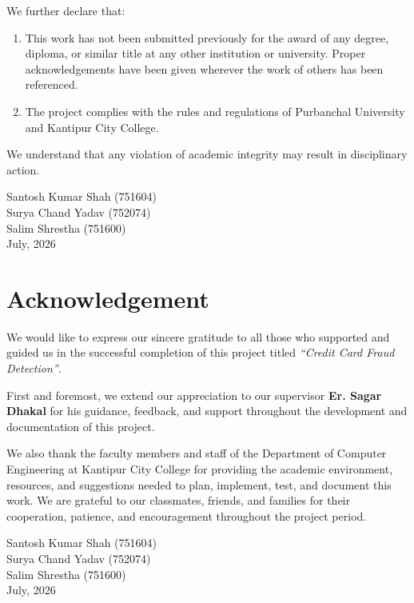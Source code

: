 \documentclass[12pt,a4paper]{report}
\newcommand{\projecttitle}{Credit Card Fraud Detection}
\newcommand{\supervisor}{Er. Sagar Dhakal}
\newcommand{\department}{Department of Computer Engineering}
\newcommand{\college}{Kantipur City College}
\begin{document}
We further declare that:
\begin{enumerate}
    \item This work has not been submitted previously for the award of any degree, diploma, or similar title at any other institution or university. Proper acknowledgements have been given wherever the work of others has been referenced.
    \item The project complies with the rules and regulations of Purbanchal University and \college.
\end{enumerate}

We understand that any violation of academic integrity may result in disciplinary action.

\vspace{1cm}
\begin{flushleft}
Santosh Kumar Shah (751604)\\
Surya Chand Yadav (752074)\\
Salim Shrestha (751600)\\
July, 2026
\end{flushleft}

\newpage

\chapter*{Acknowledgement}

We would like to express our sincere gratitude to all those who supported and guided us in the successful completion of this project titled \textit{``\projecttitle''}.

First and foremost, we extend our appreciation to our supervisor \textbf{\supervisor} for his guidance, feedback, and support throughout the development and documentation of this project.

We also thank the faculty members and staff of the \department{} at \college{} for providing the academic environment, resources, and suggestions needed to plan, implement, test, and document this work. We are grateful to our classmates, friends, and families for their cooperation, patience, and encouragement throughout the project period.

\vspace{1cm}
\begin{flushleft}
Santosh Kumar Shah (751604)\\
Surya Chand Yadav (752074)\\
Salim Shrestha (751600)\\
July, 2026
\end{flushleft}
\end{document}
